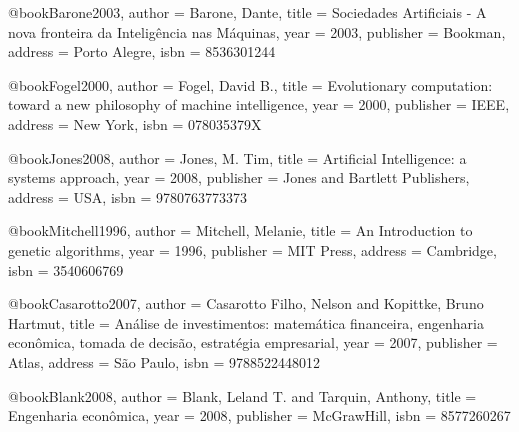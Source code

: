 @book{Barone2003,
  author = {Barone, Dante},
  title = {Sociedades Artificiais - A nova fronteira da Inteligência nas Máquinas},
  year = {2003},
  publisher = {Bookman},
  address = {Porto Alegre},
  isbn = {8536301244}
}

@book{Fogel2000,
  author = {Fogel, David B.},
  title = {Evolutionary computation: toward a new philosophy of machine intelligence},
  year = {2000},
  publisher = {IEEE},
  address = {New York},
  isbn = {078035379X}
}

@book{Jones2008,
  author = {Jones, M. Tim},
  title = {Artificial Intelligence: a systems approach},
  year = {2008},
  publisher = {Jones and Bartlett Publishers},
  address = {USA},
  isbn = {9780763773373}
}

@book{Mitchell1996,
  author = {Mitchell, Melanie},
  title = {An Introduction to genetic algorithms},
  year = {1996},
  publisher = {MIT Press},
  address = {Cambridge},
  isbn = {3540606769}
}

%

@book{Casarotto2007,
  author = {Casarotto Filho, Nelson and Kopittke, Bruno Hartmut},
  title = {Análise de investimentos: matemática financeira, engenharia econômica, tomada de decisão, estratégia empresarial},
  year = {2007},
  publisher = {Atlas},
  address = {São Paulo},
  isbn = {9788522448012}
}

@book{Blank2008,
  author = {Blank, Leland T. and Tarquin, Anthony},
  title = {Engenharia econômica},
  year = {2008},
  publisher = {McGrawHill},
  isbn = {8577260267}
}

